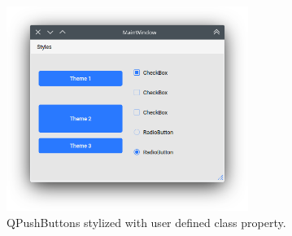 \begin{figure}[H]
\begin{centering}
% 
\includegraphics[width=0.7\textwidth]{Appendix/python_modules/Figures/qt-custom.png}
\par\end{centering}
\caption{QPushButtons stylized with user defined class property.}
\label{fig:qt-custom}
\end{figure}